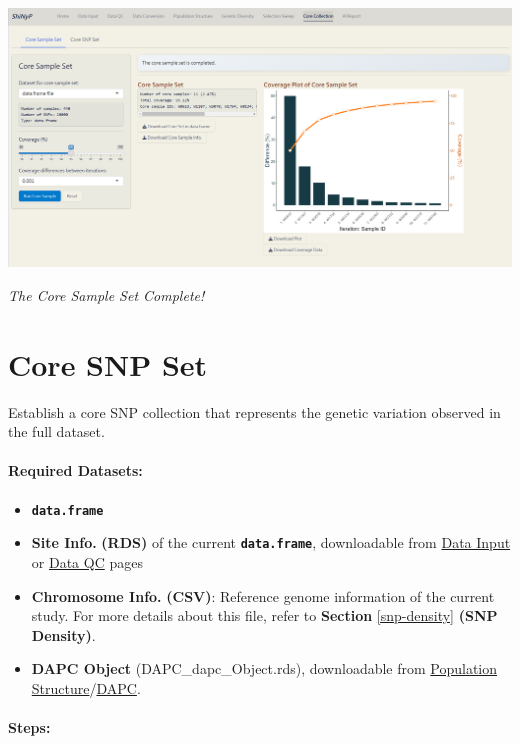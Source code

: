 \documentclass[
]{book}
\providecommand{\tightlist}{%
  \setlength{\itemsep}{0pt}\setlength{\parskip}{0pt}}
\begin{document}
\includegraphics{images/clipboard-675369449.png}

\emph{The Core Sample Set Complete!}

\section{Core SNP Set}\label{core-snp-set}

Establish a core SNP collection that represents the genetic variation observed in the full dataset.

\paragraph*{Required Datasets:}\label{required-datasets-5}

\begin{itemize}
\tightlist
\item
  {\textbf{\texttt{data.frame}}}
\item
  \textbf{Site Info.} \textbf{(RDS)} of the current {\textbf{\texttt{data.frame}}}, downloadable from \ul{Data Input} or \ul{Data QC} pages
\item
  \textbf{Chromosome Info.} \textbf{(CSV)}: Reference genome information of the current study. For more details about this file, refer to \textbf{Section} \ref{snp-density} \textbf{(SNP Density)}.
\item
  \textbf{DAPC Object} (DAPC\_dapc\_Object.rds), downloadable from \ul{Population Structure}/\ul{DAPC}.
\end{itemize}

\paragraph*{\texorpdfstring{\textbf{Steps:}}{Steps:}}\label{steps-12}
\end{document}
